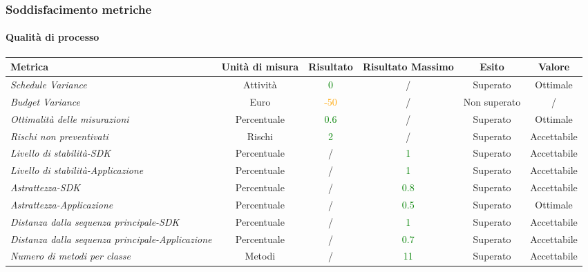 \subsubsection{Soddisfacimento metriche}

\paragraph{Qualità di processo}
\begin{longtable}{|>{\centering}m{5cm}|c|c|c|c|c|}
\hline
\textbf{Metrica} & \textbf{Unità di misura} & \textbf{Risultato} & \textbf{Risultato Massimo} & \textbf{Esito} & \textbf{Valore}\\
\hline
\endhead

\emph{Schedule Variance} & {Attività} & \textcolor{Green}{0} & / & Superato & Ottimale\\ \hline
\emph{Budget Variance} & {Euro} & \textcolor{Orange}{-50} & / & Non superato & /\\ \hline
\emph{Ottimalità delle misurazioni} & {Percentuale} & \textcolor{Green}{0.6} & / & Superato & Ottimale \\ \hline
\emph{Rischi non preventivati} & {Rischi} & \textcolor{Green}{2} & / & Superato & Accettabile\\ \hline
\emph{Livello di stabilità-SDK} & {Percentuale} & / &\textcolor{Green}{1} & Superato & Accettabile\\ \hline
\emph{Livello di stabilità-Applicazione} & {Percentuale} & / &\textcolor{Green}{1} & Superato & Accettabile\\ \hline
\emph{Astrattezza-SDK} & {Percentuale} & / &\textcolor{Green}{0.8} & Superato & Accettabile\\ \hline
\emph{Astrattezza-Applicazione} & {Percentuale} & / &\textcolor{Green}{0.5} & Superato & Ottimale\\ \hline
\emph{Distanza dalla sequenza principale-SDK} & {Percentuale} & / &\textcolor{Green}{1} & Superato & Accettabile\\ \hline
\emph{Distanza dalla sequenza principale-Applicazione} & {Percentuale} & / &\textcolor{Green}{0.7} & Superato & Accettabile\\ \hline
\emph{Numero di metodi per classe} & {Metodi} & / &\textcolor{Green}{11} & Superato & Accettabile\\ \hline

\end{longtable}
